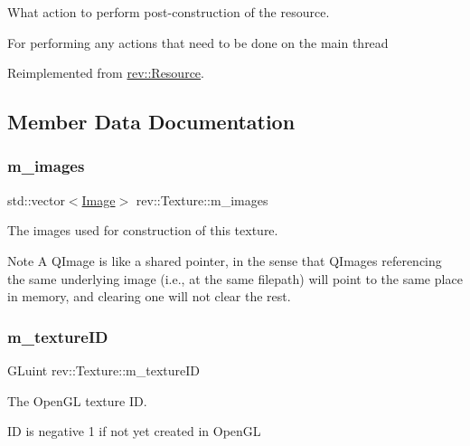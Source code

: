 What action to perform post-\/construction of the resource. 

For performing any actions that need to be done on the main thread 

Reimplemented from \mbox{\hyperlink{classrev_1_1_resource_a8a6daa71820d88c86bc6c0aa474d1af7}{rev\+::\+Resource}}.



\subsection{Member Data Documentation}
\mbox{\label{classrev_1_1_texture_a34878ce75ef85c0a4dc15a37f0ae6aa7}} 
\subsubsection{\texorpdfstring{m\_images}{m\_images}}
{\footnotesize\ttfamily std\+::vector$<$\mbox{\hyperlink{classrev_1_1_image}{Image}}$>$ rev\+::\+Texture\+::m\+\_\+images\hspace{0.3cm}{\ttfamily [protected]}}



The images used for construction of this texture. 

\begin{DoxyNote}{Note}
A Q\+Image is like a shared pointer, in the sense that Q\+Images referencing the same underlying image (i.\+e., at the same filepath) will point to the same place in memory, and clearing one will not clear the rest. 
\end{DoxyNote}
\mbox{\label{classrev_1_1_texture_a7616bcfe5801d73b266f64b05f00d829}} 
\subsubsection{\texorpdfstring{m\_textureID}{m\_textureID}}
{\footnotesize\ttfamily G\+Luint rev\+::\+Texture\+::m\+\_\+texture\+ID\hspace{0.3cm}{\ttfamily [protected]}}



The Open\+GL texture ID. 

ID is negative 1 if not yet created in Open\+GL \mbox{\label{classrev_1_1_texture_ac8561b11a04ffd525b10a48f46beb6e2}} 

